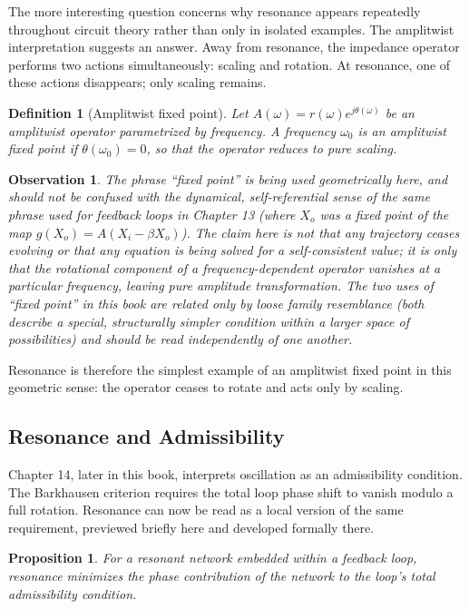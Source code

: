 \documentclass[12pt]{article}
\newtheorem{definition}{Definition}
\newtheorem{proposition}{Proposition}
\newtheorem{observation}{Observation}
\begin{document}
The more interesting question concerns why resonance appears repeatedly throughout circuit theory rather than only in isolated examples. The amplitwist interpretation suggests an answer. Away from resonance, the impedance operator performs two actions simultaneously: scaling and rotation. At resonance, one of these actions disappears; only scaling remains.

\begin{definition}[Amplitwist fixed point]
Let $A(\omega)=r(\omega)e^{j\theta(\omega)}$ be an amplitwist operator parametrized by frequency. A frequency $\omega_0$ is an amplitwist fixed point if $\theta(\omega_0)=0$, so that the operator reduces to pure scaling.
\end{definition}

\begin{observation}
The phrase ``fixed point'' is being used geometrically here, and should not be confused with the dynamical, self-referential sense of the same phrase used for feedback loops in Chapter 13 (where $X_o$ was a fixed point of the map $g(X_o)=A(X_i-\beta X_o)$). The claim here is not that any trajectory ceases evolving or that any equation is being solved for a self-consistent value; it is only that the rotational component of a frequency-dependent operator vanishes at a particular frequency, leaving pure amplitude transformation. The two uses of ``fixed point'' in this book are related only by loose family resemblance (both describe a special, structurally simpler condition within a larger space of possibilities) and should be read independently of one another.
\end{observation}

Resonance is therefore the simplest example of an amplitwist fixed point in this geometric sense: the operator ceases to rotate and acts only by scaling.

\subsection{Resonance and Admissibility}

Chapter 14, later in this book, interprets oscillation as an admissibility condition. The Barkhausen criterion requires the total loop phase shift to vanish modulo a full rotation. Resonance can now be read as a local version of the same requirement, previewed briefly here and developed formally there.

\begin{proposition}
For a resonant network embedded within a feedback loop, resonance minimizes the phase contribution of the network to the loop's total admissibility condition.
\end{proposition}
\end{document}
